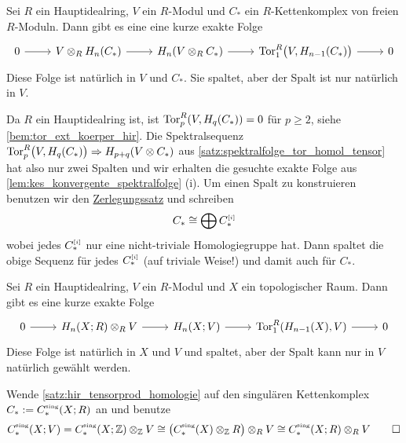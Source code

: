 \begin{satz}[label=satz:hir_tensorprod_homologie,name={Universelles Koeffizienten-Theorem für Homologie von Kettenkomplexen}]
	Sei $R$ ein Hauptidealring, $V$ ein $R$-Modul und $C_*$ ein $R$-Kettenkomplex von freien $R$-Moduln.
	Dann gibt es eine eine kurze exakte Folge
	\[
		\begin{tikzcd}
			0 \rar & V \otimes_R H_n(C_*) \rar & H_n(V \otimes_R C_*) \rar & \Tor_1^R \enbrace[\big]{V, H_{n-1}(C_*)} \rar & 0
		\end{tikzcd}
	\]
	Diese Folge ist natürlich in $V$ und $C_*$.
	Sie spaltet, aber der Spalt ist nur natürlich in $V$.
\end{satz}
\begin{beweis}
	Da $R$ ein Hauptidealring ist, ist $\Tor^R_p \enbrace*{V, H_q(C_*)}=0$ für $p \ge 2$, siehe \autoref{bem:tor_ext_koerper_hir}.
	Die Spektralsequenz $\Tor_p^R\enbrace[\big]{V, H_q(C_*)} \Rightarrow H_{p+q}(V \otimes C_*)$ aus \autoref{satz:spektralfolge_tor_homol_tensor} hat also nur zwei Spalten und wir erhalten die gesuchte exakte Folge aus \autoref{lem:kes_konvergente_spektralfolge} (i).
	Um einen Spalt zu konstruieren benutzen wir den \hyperref[zerlegungssatz]{Zerlegungssatz} und schreiben 
	\[
		C_* \cong \bigoplus C_*^\ssbbrace{i}
	\]
	wobei jedes $C_*^\ssbbrace{i}$ nur eine nicht-triviale Homologiegruppe hat.
	Dann spaltet die obige Sequenz für jedes $C_*^\ssbbrace{i}$ (auf triviale Weise!) und damit auch für $C_*$.
\end{beweis}

\begin{satz}[{name={Universelles Koeffizienten-Theorem für Homologie von Räumen}},label=satz:univ_koeff_homo_space]
	Sei $R$ ein Hauptidealring, $V$ ein $R$-Modul und $X$ ein topologischer Raum.
	Dann gibt es eine kurze exakte Folge 
	\[
		\begin{tikzcd}
			0 \rar & H_n(X;R) \otimes_R V \rar & H_n(X;V) \rar & \Tor_1^R \enbrace*{H_{n-1}(X),V} \rar & 0
		\end{tikzcd}
	\] 
	Diese Folge ist natürlich in $X$ und $V$ und spaltet, aber der Spalt kann nur in $V$ natürlich gewählt werden.
\end{satz}
\begin{beweis}
	Wende \autoref{satz:hir_tensorprod_homologie} auf den singulären Kettenkomplex $C_* := C_*^\sing(X;R)$ an und benutze 
	\[
		C_*^\sing(X;V) = C^\sing_*(X;\mathbb{Z}) \otimes_\mathbb{Z} V \cong \enbrace*{C_*^\sing(X) \otimes_\mathbb{Z} R} \otimes_R V \cong C_*^\sing(X;R) \otimes_R V \qedhere
	\]
\end{beweis}

